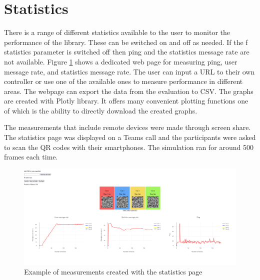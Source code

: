 \documentclass{l4proj}
\begin{document}
\section{Statistics}
There is a range of different statistics available to the user to monitor the performance of the library. These can be switched on and off as needed. If the f statistics parameter is switched off then ping and the statistics message rate are not available. Figure \ref{fig:statspage} shows a dedicated web page for measuring ping, user message rate, and statistics message rate. The user can input a URL to their own controller or use one of the available ones to measure performance in different areas. The webpage can export the data from the evaluation to CSV. The graphs are created with Plotly library. It offers many convenient plotting functions one of which is the ability to directly download the created graphs. \par 
The measurements that include remote devices were made through screen share. The statistics page was displayed on a Teams call and the participants were asked to scan the QR codes with their smartphones. The simulation ran for around 500 frames each time. 

\begin{figure}[h!]
    \includegraphics[width=\textwidth]{./images/statspage.png}
    \caption{Example of measurements created with the statistics page}
    \label{fig:statspage}
\end{figure}
\end{document}
